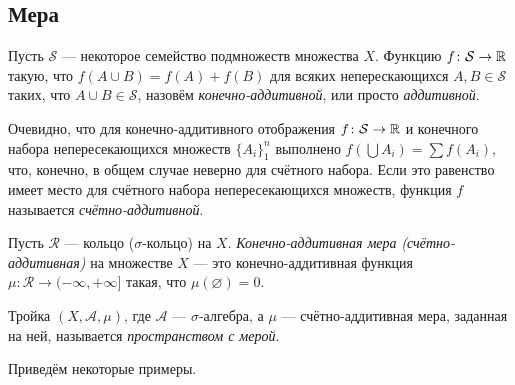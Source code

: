 \subsection{Мера}
\begin{defin}
	Пусть $\mathcal{S}$ --- некоторое семейство подмножеств множества $X$. Функцию $f\colon\mathcal{S}\to\mathbb {R}$ такую, что $f(A\cup B)=f(A)+f(B)$ для всяких неперескающихся $A,B\in\mathcal{S}$ таких, что $A\cup B\in\mathcal{S}$, назовём \textit{конечно-аддитивной}, или просто \textit{аддитивной}.
\end{defin}
Очевидно, что для конечно-аддитивного отображения $f\colon\mathcal{S}\to\mathbb {R}$ и конечного набора непересекающихся множеств $\{A_i\}_1^n$ выполнено $f\left(\bigcup A_i\right)=\sum f(A_i)$, что, конечно, в общем случае неверно для счётного набора. Если это равенство имеет место для счётного набора непересекающихся множеств, функция $f$ называется \textit{счётно-аддитивной}.
\begin{defin}
	Пусть $\mathcal{R}$ --- кольцо ($\sigma$-кольцо) на $X$. \textit{Конечно-аддитивная мера} \textit{(счётно-аддитивная)} на множестве $X$ --- это конечно-аддитивная функция $\mu\colon\mathcal{R}\to(-\infty,+\infty]$ такая, что $\mu(\varnothing)=0$.
\end{defin}
\begin{defin}
	Тройка $(X,\mathcal{A},\mu)$, где $\mathcal{A}$ --- $\sigma$-алгебра, а $\mu$ --- счётно-аддитивная мера, заданная на ней, называется \textit{пространством с мерой}.
\end{defin}
Приведём некоторые примеры.
